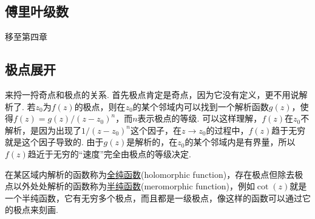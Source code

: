 \documentclass[main.tex]{subfiles}
\begin{document}


\subsection{傅里叶级数}

移至第四章

\subsection{极点展开}

来捋一捋奇点和极点的关系. 首先极点肯定是奇点，因为它没有定义，更不用说解析了. 若\(z_0\)为\(f(z)\)的极点，则在\(z_0\)的某个邻域内可以找到一个解析函数\(g(z)\)，使得\(f(z)=g(z)/(z-z_0)^n\)，而\(n\)表示极点的等级. 可以这样理解，\(f(z)\)在\(z_0\)不解析，是因为出现了\(1/(z-z_0)^n\)这个因子，在\(z \to z_0\)的过程中，\(f(z)\)趋于无穷就是这个因子导致的. 由于\(g(z)\)是解析的，在\(z_0\)的某个邻域内是有界量，所以\(f(z)\)趋近于无穷的“速度”完全由极点的等级决定.

在某区域内解析的函数称为\uline{全纯函数}(holomorphic function)，存在极点但除去极点以外处处解析的函数称为\uline{半纯函数}(meromorphic function)，例如\(\cot(z)\)就是一个半纯函数，它有无穷多个极点，而且都是一级极点，像这样的函数可以通过它的极点来刻画. 
\end{document}
